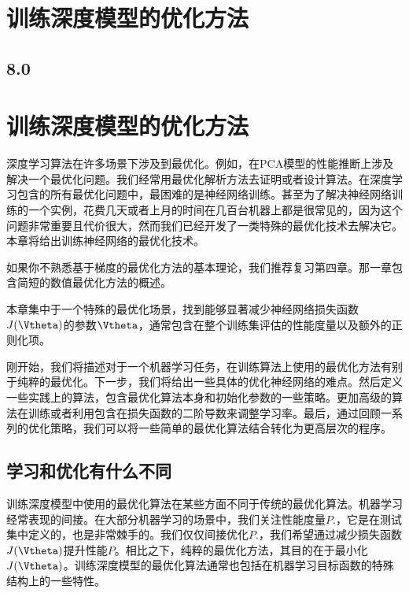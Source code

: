 \chapter{训练深度模型的优化方法}
\label{chap:8}
\section{8.0}

\chapter{训练深度模型的优化方法}

深度学习算法在许多场景下涉及到最优化。例如，在PCA模型的性能推断上涉及解决一个最优化问题。我们经常用最优化解析方法去证明或者设计算法。在深度学习包含的所有最优化问题中，最困难的是神经网络训练。甚至为了解决神经网络训练的一个实例，花费几天或者上月的时间在几百台机器上都是很常见的，因为这个问题非常重要且代价很大，然而我们已经开发了一类特殊的最优化技术去解决它。本章将给出训练神经网络的最优化技术。

如果你不熟悉基于梯度的最优化方法的基本理论，我们推荐复习第四章。那一章包含简短的数值最优化方法的概述。

本章集中于一个特殊的最优化场景，找到能够显著减少神经网络损失函数$J(\Vtheta)$的参数$\Vtheta$，通常包含在整个训练集评估的性能度量以及额外的正则化项。
	
刚开始，我们将描述对于一个机器学习任务，在训练算法上使用的最优化方法有别于纯粹的最优化。下一步，我们将给出一些具体的优化神经网络的难点。然后定义一些实践上的算法，包含最优化算法本身和初始化参数的一些策略。更加高级的算法在训练或者利用包含在损失函数的二阶导数来调整学习率。最后，通过回顾一系列的优化策略，我们可以将一些简单的最优化算法结合转化为更高层次的程序。

\section{学习和优化有什么不同}

训练深度模型中使用的最优化算法在某些方面不同于传统的最优化算法。机器学习经常表现的间接。在大部分机器学习的场景中，我们关注性能度量$P$.，它是在测试集中定义的，也是非常棘手的。我们仅仅间接优化$P$.，我们希望通过减少损失函数$J(\Vtheta)$提升性能$P$。相比之下，纯粹的最优化方法，其目的在于最小化$J(\Vtheta)$。训练深度模型的最优化算法通常也包括在机器学习目标函数的特殊结构上的一些特性。

